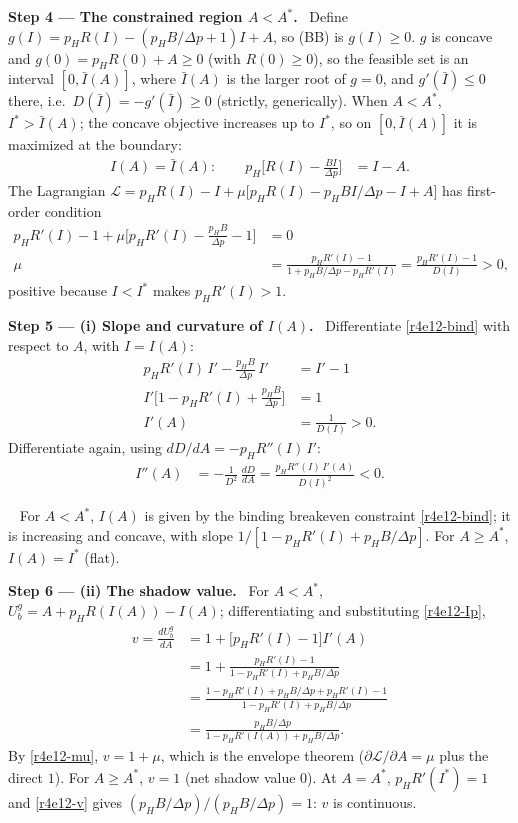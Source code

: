 \documentclass[11pt,a4paper]{article}
\newcommand{\step}[2]{\par\medskip\noindent\textbf{Step #1 --- #2.}~}
\newcommand{\answer}[1]{\par\smallskip\noindent\fbox{\textbf{Answer #1.}}~}
\begin{document}
\step{4}{The constrained region $A<A^*$} Define $g(I)=p_HR(I)-(p_HB/\Delta p+1)I+A$, so (BB) is
$g(I)\ge 0$. $g$ is concave and $g(0)=p_HR(0)+A\ge 0$ (with $R(0)\ge 0$), so the feasible set is an interval
$[0,\bar I(A)]$, where $\bar I(A)$ is the larger root of $g=0$, and $g'(\bar I)\le 0$ there, i.e.\
$D(\bar I)=-g'(\bar I)\ge 0$ (strictly, generically). When $A<A^*$, $I^*>\bar I(A)$; the concave
objective increases up to $I^*$, so on $[0,\bar I(A)]$ it is maximized at the boundary:
\begin{align}
  I(A)=\bar I(A):\qquad p_H\Big[R(I)-\frac{BI}{\Delta p}\Big] &= I-A. \label{r4e12-bind}
\end{align}
The Lagrangian $\mathcal L=p_HR(I)-I+\mu\big[p_HR(I)-p_HBI/\Delta p-I+A\big]$ has first-order condition
\begin{align}
  p_HR'(I)-1+\mu\Big[p_HR'(I)-\frac{p_HB}{\Delta p}-1\Big] &= 0 \nonumber\\
  \mu &= \frac{p_HR'(I)-1}{1+p_HB/\Delta p-p_HR'(I)} = \frac{p_HR'(I)-1}{D(I)} > 0, \label{r4e12-mu}
\end{align}
positive because $I<I^*$ makes $p_HR'(I)>1$.

\step{5}{(i) Slope and curvature of $I(A)$} Differentiate \eqref{r4e12-bind} with respect to $A$,
with $I=I(A)$:
\begin{align}
  p_HR'(I)\,I'-\frac{p_HB}{\Delta p}\,I' &= I'-1 \nonumber\\
  I'\Big[1-p_HR'(I)+\frac{p_HB}{\Delta p}\Big] &= 1 \nonumber\\
  I'(A) &= \frac{1}{D(I)} > 0. \label{r4e12-Ip}
\end{align}
Differentiate again, using $dD/dA=-p_HR''(I)\,I'$:
\begin{align}
  I''(A) &= -\frac{1}{D^2}\,\frac{dD}{dA} = \frac{p_HR''(I)\,I'(A)}{D(I)^2} < 0. \nonumber
\end{align}

\answer{(i)} For $A<A^*$, $I(A)$ is given by the binding breakeven constraint
\eqref{r4e12-bind}; it is increasing and concave, with slope $1/[1-p_HR'(I)+p_HB/\Delta p]$. For
$A\ge A^*$, $I(A)=I^*$ (flat).

\step{6}{(ii) The shadow value} For $A<A^*$, $U_b^g=A+p_HR(I(A))-I(A)$; differentiating and
substituting \eqref{r4e12-Ip},
\begin{align}
  v=\frac{dU_b^g}{dA} &= 1+\big[p_HR'(I)-1\big]I'(A) \nonumber\\
    &= 1+\frac{p_HR'(I)-1}{1-p_HR'(I)+p_HB/\Delta p} \nonumber\\
    &= \frac{1-p_HR'(I)+p_HB/\Delta p+p_HR'(I)-1}{1-p_HR'(I)+p_HB/\Delta p} \nonumber\\
    &= \frac{p_HB/\Delta p}{1-p_HR'(I(A))+p_HB/\Delta p}. \label{r4e12-v}
\end{align}
By \eqref{r4e12-mu}, $v=1+\mu$, which is the envelope theorem ($\partial\mathcal L/\partial A=\mu$
plus the direct $1$). For $A\ge A^*$, $v=1$ (net shadow value $0$). At $A=A^*$,
$p_HR'(I^*)=1$ and \eqref{r4e12-v} gives $(p_HB/\Delta p)/(p_HB/\Delta p)=1$: $v$ is continuous.
\end{document}
